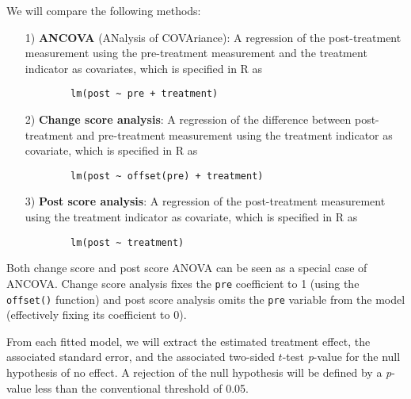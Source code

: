 \documentclass[12pt]{article}
\begin{document}

\begin{examplebox}
We will compare the following methods:
    \begin{itemize}
    \item[1)] \textbf{ANCOVA} (ANalysis of COVAriance): A regression of the post-treatment measurement using the pre-treatment measurement and the treatment indicator as covariates,
    which is specified in R as
    \begin{verbatim}
        lm(post ~ pre + treatment)
    \end{verbatim}

    \item[2)] \textbf{Change score analysis}: A regression of the difference between post-treatment and pre-treatment measurement using the treatment indicator as covariate,
    which is specified in R as
    \begin{verbatim}
        lm(post ~ offset(pre) + treatment)
    \end{verbatim}

    \item[3)] \textbf{Post score analysis}: A regression of the post-treatment measurement using the treatment indicator as covariate,
    which is specified in R as
    \begin{verbatim}
        lm(post ~ treatment)
    \end{verbatim}
\end{itemize}
Both change score and post score ANOVA can be seen as a special case of ANCOVA. Change score analysis fixes the \texttt{pre} coefficient to 1 (using the \texttt{offset()} function) and post score analysis omits the \texttt{pre} variable from the model (effectively fixing its coefficient to 0).

From each fitted model, we will extract the estimated treatment effect, the associated standard error, and the associated two-sided $t$-test \textit{p}-value for the null hypothesis of no effect. A rejection of the null hypothesis will be defined by a \textit{p}-value less than the conventional threshold of 0.05.
\end{examplebox}
\end{document}
